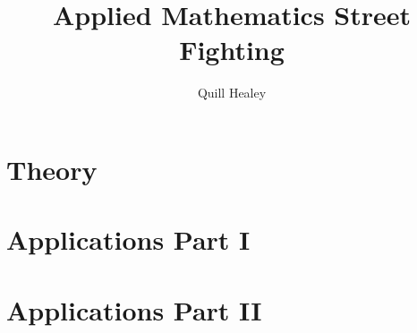 \documentclass[12pt,reqno]{report}
\title{Applied Mathematics Street Fighting}
\author{Quill Healey}
\theoremstyle{definition}
\numberwithin{equation}{section}
\begin{document}
\maketitle
\tableofcontents

% 



\part{Theory}







\part{Applications Part I}











\part{Applications Part II}

\end{document}
